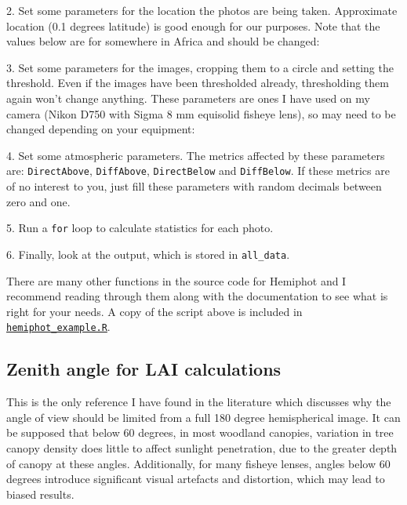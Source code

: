 \documentclass{article}
\newcommand\file[1]{\texttt{\underline{#1}}}
\begin{document}
\begin{minipage}{\linewidth}
2. Set some parameters for the location the photos are being taken. Approximate location (0.1 degrees latitude) is good enough for our purposes. Note that the values below are for somewhere in Africa and should be changed:

\end{minipage}


\begin{minipage}{\linewidth}
3. Set some parameters for the images, cropping them to a circle and setting the threshold. Even if the images have been thresholded already, thresholding them again won't change anything. These parameters are ones I have used on my camera (Nikon D750 with Sigma 8 mm equisolid fisheye lens), so may need to be changed depending on your equipment:

\end{minipage}


\begin{minipage}{\linewidth}
4. Set some atmospheric parameters. The metrics affected by these parameters are: \verb|DirectAbove|, \verb|DiffAbove|, \verb|DirectBelow| and \verb|DiffBelow|. If these metrics are of no interest to you, just fill these parameters with random decimals between zero and one.

\end{minipage}


\begin{minipage}{\linewidth}
5. Run a \verb|for| loop to calculate statistics for each photo.

\end{minipage}

6. Finally, look at the output, which is stored in \verb|all_data|.

There are many other functions in the source code for Hemiphot and I recommend reading through them along with the documentation to see what is right for your needs. A copy of the script above is included in \file{hemiphot\_example.R}.

\subsection{Zenith angle for LAI calculations} \label{fov}

This is the only reference I have found in the literature which discusses why the angle of view should be limited from a full 180 degree hemispherical image. It can be supposed that below 60 degrees, in most woodland canopies, variation in tree canopy density does little to affect sunlight penetration, due to the greater depth of canopy at these angles. Additionally, for many fisheye lenses, angles below 60 degrees introduce significant visual artefacts and distortion, which may lead to biased results. 
\end{document}
